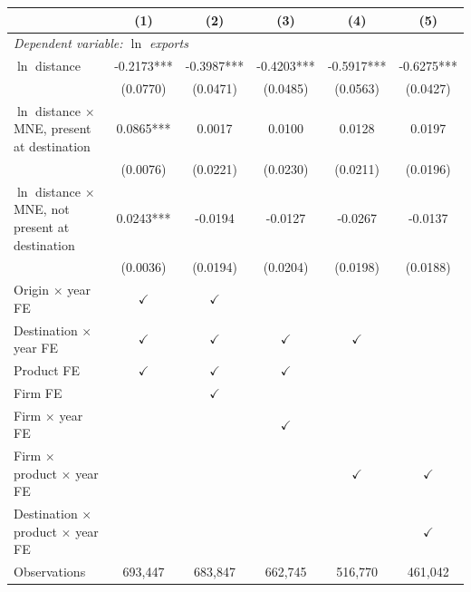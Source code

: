 \begin{tabular}{lccccc} \hline
 & (1) & (2) & (3) & (4) & (5) \\ \hline
\multicolumn{6}{l}{\textit{Dependent variable: $\ln$ exports}} \\
$\ln$ distance & -0.2173*** & -0.3987*** & -0.4203*** & -0.5917*** & -0.6275*** \\
 & (0.0770) & (0.0471) & (0.0485) & (0.0563) & (0.0427) \\
$\ln$ distance $\times$ MNE, present at destination & 0.0865*** & 0.0017 & 0.0100 & 0.0128 & 0.0197 \\
 & (0.0076) & (0.0221) & (0.0230) & (0.0211) & (0.0196) \\
$\ln$ distance $\times$ MNE, not present at destination & 0.0243*** & -0.0194 & -0.0127 & -0.0267 & -0.0137 \\
 & (0.0036) & (0.0194) & (0.0204) & (0.0198) & (0.0188) \\
\hline
Origin $\times$ year FE & $\checkmark$ & $\checkmark$ &  &  &  \\
Destination $\times$ year FE & $\checkmark$ & $\checkmark$ & $\checkmark$ & $\checkmark$ &  \\
Product FE & $\checkmark$ & $\checkmark$ & $\checkmark$ &  &  \\
Firm FE &  & $\checkmark$ &  &  &  \\
Firm $\times$ year FE &  &  & $\checkmark$ &  &  \\
Firm $\times$ product $\times$ year FE &  &  &  & $\checkmark$ & $\checkmark$ \\
Destination $\times$ product $\times$ year FE &  &  &  &  & $\checkmark$ \\
Observations & 693,447 & 683,847 & 662,745 & 516,770 & 461,042 \\
\hline
\end{tabular}
